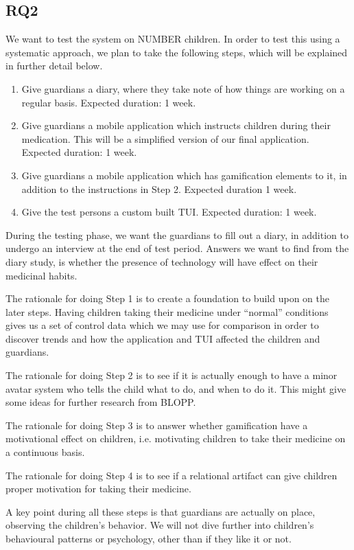 \subsection{RQ2}
\label{sec:RQ2-methodology}
We want to test the system on NUMBER children. In order to test this using a systematic approach, we plan to take the following steps, which will be explained in further detail below. 
\begin{enumerate}
  \item Give guardians a diary, where they take note of how things are working on a regular basis. Expected duration: 1 week.
  \item Give guardians a mobile application which instructs children during their medication. This will be a simplified version of our final application. Expected duration: 1 week. 
  \item Give guardians a mobile application which has gamification elements to it, in addition to the instructions in Step 2. Expected duration 1 week.   
  \item Give the test persons a custom built TUI. Expected duration: 1 week. 
\end{enumerate}
During the testing phase, we want the guardians to fill out a diary, in addition to undergo an interview at the end of test period. Answers we want to find from the diary study, is whether the presence of technology will have effect on their medicinal habits. 

The rationale for doing Step 1 is to create a foundation to build upon on the later steps. Having children taking their medicine under ``normal'' conditions gives us a set of control data which we may use for comparison in order to discover trends and how the application and TUI affected the children and guardians. 

The rationale for doing Step 2 is to see if it is actually enough to have a minor avatar system who tells the child what to do, and when to do it. This might give some ideas for further research from BLOPP. 


The rationale for doing Step 3 is to answer whether gamification have a motivational effect on children, i.e. motivating children to take their medicine on a continuous basis. 

The rationale for doing Step 4 is to see if a relational artifact can give children proper motivation for taking their medicine.

A key point during all these steps is that guardians are actually on place, observing the children's behavior. We will not dive further into children's behavioural patterns or psychology, other than if they like it or not.    
 
